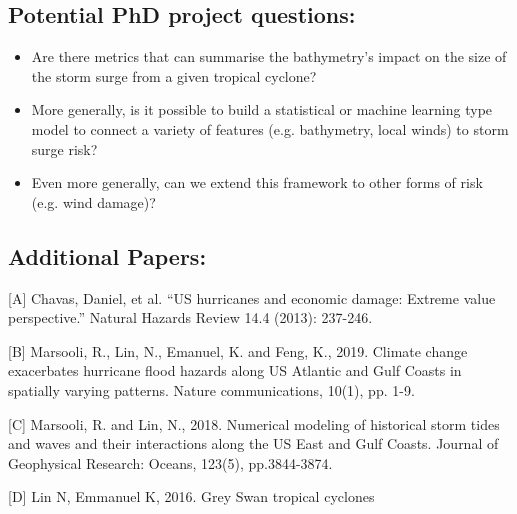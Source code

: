 \documentclass[usenames, dvipsnames]{article}      %
\begin{document}
\subsection*{Potential PhD project questions:}

\begin{itemize}
    \item Are there metrics that can summarise the bathymetry’s impact on the size of the storm surge from a given tropical cyclone?

    \item More generally, is it possible to build a statistical or machine learning type model to connect a variety of features (e.g. bathymetry, local winds) to storm surge risk?

    \item Even more generally, can we extend this framework to other forms of risk (e.g. wind damage)?
\end{itemize}

\subsection*{Additional Papers:}


[A] Chavas, Daniel, et al. ``US hurricanes and economic damage: Extreme value perspective.'' Natural Hazards Review 14.4 (2013): 237-246.

[B] Marsooli, R., Lin, N., Emanuel, K. and Feng, K., 2019. Climate change exacerbates hurricane flood hazards along US Atlantic and Gulf Coasts in spatially varying patterns. Nature communications, 10(1), pp. 1-9.

[C] Marsooli, R. and Lin, N., 2018. Numerical modeling of historical storm tides and waves and their interactions along the US East and Gulf Coasts. Journal of Geophysical Research: Oceans, 123(5), pp.3844-3874.

[D] Lin N, Emmanuel K, 2016. Grey Swan tropical cyclones


\printbibliography
\end{document}
